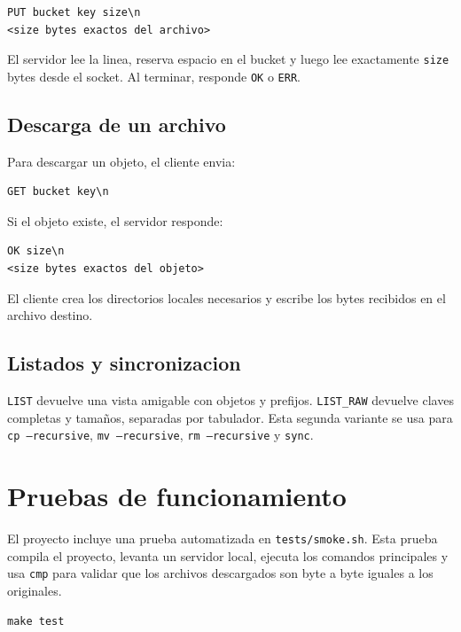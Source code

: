 \documentclass[12pt,letterpaper]{article}
\begin{document}
\begin{lstlisting}[style=console]
PUT bucket key size\n
<size bytes exactos del archivo>
\end{lstlisting}

El servidor lee la linea, reserva espacio en el bucket y luego lee exactamente
\texttt{size} bytes desde el socket. Al terminar, responde \texttt{OK} o \texttt{ERR}.

\subsection{Descarga de un archivo}

Para descargar un objeto, el cliente envia:

\begin{lstlisting}[style=console]
GET bucket key\n
\end{lstlisting}

Si el objeto existe, el servidor responde:

\begin{lstlisting}[style=console]
OK size\n
<size bytes exactos del objeto>
\end{lstlisting}

El cliente crea los directorios locales necesarios y escribe los bytes recibidos en el
archivo destino.

\subsection{Listados y sincronizacion}

\texttt{LIST} devuelve una vista amigable con objetos y prefijos. \texttt{LIST\_RAW}
devuelve claves completas y tama\~{n}os, separadas por tabulador. Esta segunda variante se
usa para \texttt{cp --recursive}, \texttt{mv --recursive}, \texttt{rm --recursive} y
\texttt{sync}.

\section{Pruebas de funcionamiento}

El proyecto incluye una prueba automatizada en \texttt{tests/smoke.sh}. Esta prueba
compila el proyecto, levanta un servidor local, ejecuta los comandos principales y usa
\texttt{cmp} para validar que los archivos descargados son byte a byte iguales a los
originales.

\begin{lstlisting}[style=console]
make test
\end{lstlisting}
\end{document}

